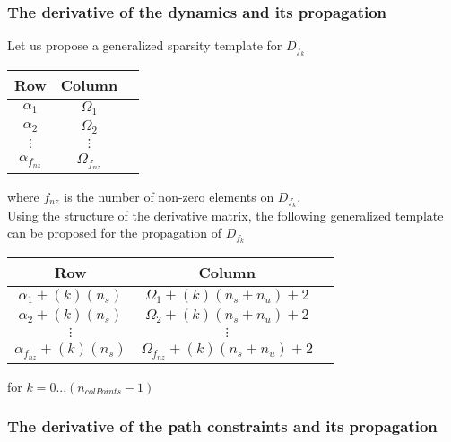\documentclass[12pt]{article}
\begin{document}
\newpage
\subsubsection{The derivative of the dynamics and its propagation}

Let us propose a generalized sparsity template for $D_{f_k}$

\begin{table}[h]
\begin{center}
\begin{tabular}{c|c|c}
Row                 & Column            \\ \hline
$\alpha_1$          & $\Omega_1$         \\
$\alpha_2$          & $\Omega_2$         \\
$\vdots$            & $\vdots$          \\
$\alpha_{f_{nz}}$   & $\Omega_{f_{nz}}$  \\
\end{tabular}
\end{center}
\end{table}

\noindent where $f_{nz}$ is the number of non-zero elements on $D_{f_k}$.\\

\noindent Using the structure of the derivative matrix, the following generalized template can be proposed for the propagation of $D_{f_k}$

\begin{table}[h]
\begin{center}
\begin{tabular}{c|c|c}
Row                 & Column            \\ \hline
$\alpha_1+(k)(n_s)$          & $\Omega_1+(k)(n_s+n_u)+2$         \\
$\alpha_2+(k)(n_s)$          & $\Omega_2+(k)(n_s+n_u)+2$         \\
$\vdots$            & $\vdots$          \\
$\alpha_{f_{nz}}+(k)(n_s)$   & $\Omega_{f_{nz}}+(k)(n_s+n_u)+2$  \\
\end{tabular}
\end{center}
\end{table}

\noindent for $k=0...(n_{colPoints}-1)$

\subsubsection{The derivative of the path constraints and its propagation}
\end{document}
